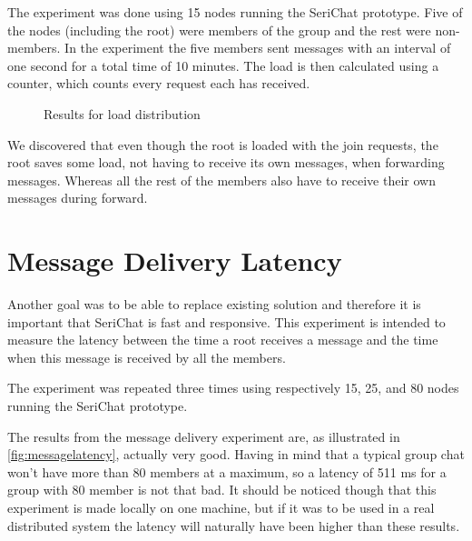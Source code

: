 The experiment was done using 15 nodes running the SeriChat prototype. Five of the nodes (including the root) were members of the group and the rest were non-members. In the experiment the five members sent messages with an interval of one second for a total time of 10 minutes. The load is then calculated using a counter, which counts every request each has received.
\begin{figure}[!h]
	\centering
{}
\caption{Results for load distribution} \label{fig:loaddistribution}
\end{figure}

We discovered that even though the root is loaded with the join requests, the root saves some load, not having to receive its own messages, when forwarding messages. Whereas all the rest of the members also have to receive their own messages during forward.

\section{Message Delivery Latency}
Another goal was to be able to replace existing solution and therefore it is important that SeriChat is fast and responsive. 
This experiment is intended to measure the latency between the time a root receives a message and the time when this message is received by all the members. 

The experiment was repeated three times using respectively 15, 25, and 80 nodes running the SeriChat prototype. 

The results from the message delivery experiment are, as illustrated in \autoref{fig:messagelatency}, actually very good. Having in mind that a typical group chat won't have more than 80 members at a maximum, so a latency of 511 ms for a group with 80 member is not that bad. It should be noticed though that this experiment is made locally on one machine, but if it was to be used in a real distributed system the latency will naturally have been higher than these results.   

